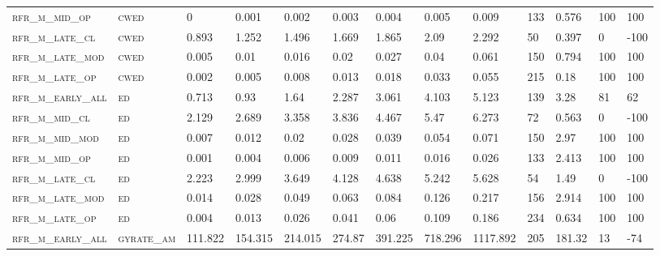 \begin{landscape}
\begin{center}
\begin{footnotesize}
\begin{longtable}{lllllllllllll}
\textsc{rfr\_m\_mid\_op   } & \textsc{cwed      }   & 0       & 0.001   & 0.002    & 0.003    & 0.004    & 0.005    & 0.009    & 133    & 0.576         & 100           & 100      \\
\textsc{rfr\_m\_late\_cl  } & \textsc{cwed      }   & 0.893   & 1.252   & 1.496    & 1.669    & 1.865    & 2.09     & 2.292    & 50     & 0.397         & 0             & -100     \\
\textsc{rfr\_m\_late\_mod } & \textsc{cwed      }   & 0.005   & 0.01    & 0.016    & 0.02     & 0.027    & 0.04     & 0.061    & 150    & 0.794         & 100           & 100      \\
\textsc{rfr\_m\_late\_op  } & \textsc{cwed      }   & 0.002   & 0.005   & 0.008    & 0.013    & 0.018    & 0.033    & 0.055    & 215    & 0.18          & 100           & 100      \\
\textsc{rfr\_m\_early\_all} & \textsc{ed        }   & 0.713   & 0.93    & 1.64     & 2.287    & 3.061    & 4.103    & 5.123    & 139    & 3.28          & 81            & 62       \\
\textsc{rfr\_m\_mid\_cl   } & \textsc{ed        }   & 2.129   & 2.689   & 3.358    & 3.836    & 4.467    & 5.47     & 6.273    & 72     & 0.563         & 0             & -100     \\
\textsc{rfr\_m\_mid\_mod  } & \textsc{ed        }   & 0.007   & 0.012   & 0.02     & 0.028    & 0.039    & 0.054    & 0.071    & 150    & 2.97          & 100           & 100      \\
\textsc{rfr\_m\_mid\_op   } & \textsc{ed        }   & 0.001   & 0.004   & 0.006    & 0.009    & 0.011    & 0.016    & 0.026    & 133    & 2.413         & 100           & 100      \\
\textsc{rfr\_m\_late\_cl  } & \textsc{ed        }   & 2.223   & 2.999   & 3.649    & 4.128    & 4.638    & 5.242    & 5.628    & 54     & 1.49          & 0             & -100     \\
\textsc{rfr\_m\_late\_mod } & \textsc{ed        }   & 0.014   & 0.028   & 0.049    & 0.063    & 0.084    & 0.126    & 0.217    & 156    & 2.914         & 100           & 100      \\
\textsc{rfr\_m\_late\_op  } & \textsc{ed        }   & 0.004   & 0.013   & 0.026    & 0.041    & 0.06     & 0.109    & 0.186    & 234    & 0.634         & 100           & 100      \\
\textsc{rfr\_m\_early\_all} & \textsc{gyrate\_am}   & 111.822 & 154.315 & 214.015  & 274.87   & 391.225  & 718.296  & 1117.892 & 205    & 181.32        & 13            & -74      \\

\end{longtable}
\end{footnotesize}
\end{center}
\end{landscape}
